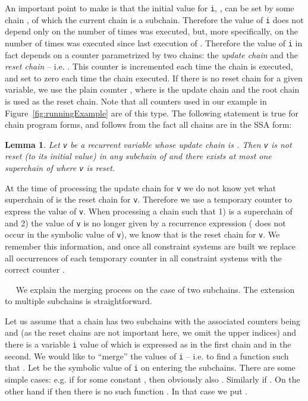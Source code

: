 \documentclass{llncs}
\newtheorem{lem}{Lemma}
\renewcommand{\paragraph}[1]{\vspace{0.2cm}\noindent{\bf #1}~~}
\begin{document}
An important point to make is that the initial value for \texttt{i},
, can be set by some chain , of which the current
chain  is a subchain. Therefore the value of \texttt{i} does not depend
only on the number of times  was executed, but, more specifically, on the number of times 
was executed since last execution of . Therefore the value of \texttt{i}
in fact depends on a counter  parametrized by two chains:
the \emph{update chain}  and the \emph{reset chain}  --
i.e. . This counter
is incremented each time the chain  is executed, and set to zero each
time the chain  executed. If there is no reset chain for a given
variable, we use the plain counter , where  is the update
chain and the root chain is used as the reset chain. Note that all counters used in our example in
Figure~\ref{fig:runningExample} are of this type. The following statement is
true for chain program forms, and follows from the fact all chains are in
the SSA form:

\begin{lem}
  Let \texttt{v} be a recurrent variable whose update chain is . Then
  \texttt{v} is not reset (to its initial value) in any subchain of  and
  there exists at most one superchain of  where \texttt{v} is reset.
\end{lem}

At the time of processing the update chain  for \texttt{v} we do not know
yet what superchain of  is the reset chain for \texttt{v}. Therefore we
use a temporary counter  to express the value of
\texttt{v}. When processing a chain  such that 1)  is a superchain of
 and 2) the value of \texttt{v} is no longer given by a recurrence
expression ( does not occur in the symbolic value of
\texttt{v}), we know that  is the reset chain for \texttt{v}. We remember
this information, and once all constraint systems are built we replace all
occurrences of each temporary counter  in all constraint
systems with the correct counter .


\paragraph{Merging values from subchains}
We explain the merging process on the case of two subchains. The extension
to multiple subchains is straightforward.

Let us assume that a chain has two subchains with the associated counters
being  and  (as the reset chains are not important
here, we omit the upper indices) and there is a variable \texttt{i} value of which
is expressed as  in the first chain and 
in the second. We would like to ``merge'' the values of \texttt{i} -- i.e. to find
a function  such that . Let 
be the symbolic value of \texttt{i} on entering the subchains. There are
some simple cases: e.g. if  for some constant
, then obviously also . Similarly if
. On the other hand if
 then there is no such function
. In that case we put .
\end{document}

